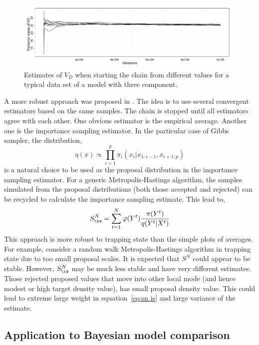 \begin{figure}
  \includegraphics[width=\linewidth]{fig/PET_VD}
  \caption{Estimates of $V_D$ when starting the \mcmc chain from different
    values for a typical data set of a \pet model with three component.}
  \label{fig:pet vd mean}
\end{figure}

A more robust approach was proposed in \cite{Robert:1995ge}. The idea is to
use several convergent estimators based on the same samples. The chain is
stopped until all estimators agree with each other. One obvious estimator is
the empirical average. Another one is the importance sampling estimator. In
the particular case of Gibbs sampler, the distribution,
\begin{equation}
  \eta(x) \propto \prod_{i=1}^p \pi_i(x_i|x_{1:i-1},x_{i+1:p})
\end{equation}
is a natural choice to be used as the proposal distribution in the importance
sampling estimator. For a generic Metropolis-Hastings algorithm, the samples
simulated from the proposal distributions (both those accepted and rejected)
can be recycled to calculate the importance sampling estimate. This lead to,
\begin{equation}
  S_{\is}^N = \sum_{t=1}^N \varphi(Y^t) \frac{\pi(Y^t)}{q(Y^t|X^t)}
  \label{eq:sn is}
\end{equation}
This approach is more robust to trapping state than the simple plots of
averages. For example, consider a random walk Metropolis-Hastings algorithm in
trapping state due to too small proposal scales. It is expected that $S^N$
could appear to be stable. However, $S_{\is}^N$ may be much less stable and
have very different estimates. Those rejected proposed values that move into
other local mode (and hence modest or high target density value), has small
proposal density value. This could lead to extreme large weight in
equation~\ref{eq:sn is} and large variance of the estimate.

\subsection{Application to Bayesian model comparison}
\label{sub:MCMC Application to Bayesian model comparison}

